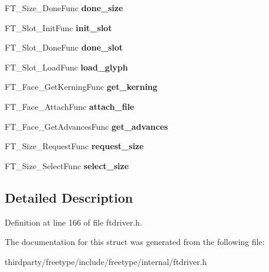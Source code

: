 \begin{DoxyCompactItemize}
\item 
\mbox{\label{struct_f_t___driver___class_rec___a5c96f627816a089b27bcff09f22dd1a6}} 
F\+T\+\_\+\+Size\+\_\+\+Done\+Func {\bfseries done\+\_\+size}
\item 
\mbox{\label{struct_f_t___driver___class_rec___ae4e1d4ec7bdbdee0b4a5f8fc8f113d30}} 
F\+T\+\_\+\+Slot\+\_\+\+Init\+Func {\bfseries init\+\_\+slot}
\item 
\mbox{\label{struct_f_t___driver___class_rec___a548a343f5921f5d341142bf3743c42d4}} 
F\+T\+\_\+\+Slot\+\_\+\+Done\+Func {\bfseries done\+\_\+slot}
\item 
\mbox{\label{struct_f_t___driver___class_rec___a49dbd71e64094d4d825b8b8d51dd4e47}} 
F\+T\+\_\+\+Slot\+\_\+\+Load\+Func {\bfseries load\+\_\+glyph}
\item 
\mbox{\label{struct_f_t___driver___class_rec___a398395bfdbef65a8d531724d200ed91c}} 
F\+T\+\_\+\+Face\+\_\+\+Get\+Kerning\+Func {\bfseries get\+\_\+kerning}
\item 
\mbox{\label{struct_f_t___driver___class_rec___a9caec9ae56a4bab9c90cede699279f29}} 
F\+T\+\_\+\+Face\+\_\+\+Attach\+Func {\bfseries attach\+\_\+file}
\item 
\mbox{\label{struct_f_t___driver___class_rec___aad560cd145b6d7cab7eae79194b1d724}} 
F\+T\+\_\+\+Face\+\_\+\+Get\+Advances\+Func {\bfseries get\+\_\+advances}
\item 
\mbox{\label{struct_f_t___driver___class_rec___a03ff7c2e4a2fb6d08eb481b03a78e8de}} 
F\+T\+\_\+\+Size\+\_\+\+Request\+Func {\bfseries request\+\_\+size}
\item 
\mbox{\label{struct_f_t___driver___class_rec___a1b365eb82525dae0a816974d949fe0dd}} 
F\+T\+\_\+\+Size\+\_\+\+Select\+Func {\bfseries select\+\_\+size}
\end{DoxyCompactItemize}


\subsection{Detailed Description}


Definition at line 166 of file ftdriver.\+h.



The documentation for this struct was generated from the following file\+:\begin{DoxyCompactItemize}
\item 
thirdparty/freetype/include/freetype/internal/ftdriver.\+h\end{DoxyCompactItemize}
